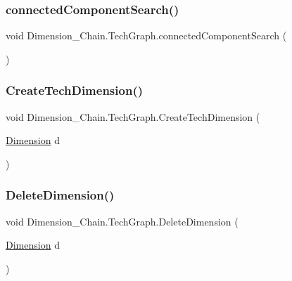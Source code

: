 \subsubsection{\texorpdfstring{connected\+Component\+Search()}{connectedComponentSearch()}}
{\footnotesize\ttfamily void Dimension\+\_\+\+Chain.\+Tech\+Graph.\+connected\+Component\+Search (\begin{DoxyParamCaption}{ }\end{DoxyParamCaption})}

\mbox{\label{class_dimension___chain_1_1_tech_graph_a49d45bd79eaf34122021af1118156575}} 
\subsubsection{\texorpdfstring{Create\+Tech\+Dimension()}{CreateTechDimension()}}
{\footnotesize\ttfamily void Dimension\+\_\+\+Chain.\+Tech\+Graph.\+Create\+Tech\+Dimension (\begin{DoxyParamCaption}\item[{\mbox{\hyperlink{class_dimension___chain_1_1_dimension}{Dimension}}}]{d }\end{DoxyParamCaption})}

\mbox{\label{class_dimension___chain_1_1_tech_graph_a23f591d1b16a26f6f5a8b3fb19928efd}} 
\subsubsection{\texorpdfstring{Delete\+Dimension()}{DeleteDimension()}}
{\footnotesize\ttfamily void Dimension\+\_\+\+Chain.\+Tech\+Graph.\+Delete\+Dimension (\begin{DoxyParamCaption}\item[{\mbox{\hyperlink{class_dimension___chain_1_1_dimension}{Dimension}}}]{d }\end{DoxyParamCaption})}

